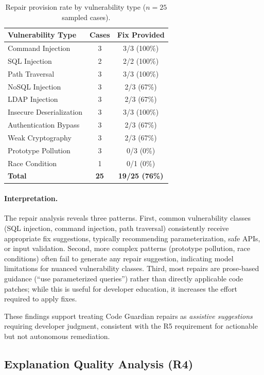 \begin{table}[H]
  \centering
  \caption{Repair provision rate by vulnerability type ($n=25$ sampled cases).}
  \label{tab:repair-by-type}
  \footnotesize
  \begin{tabular}{lcc}
    \toprule
    Vulnerability Type & Cases & Fix Provided \\
    \midrule
    Command Injection & 3 & 3/3 (100\%) \\
    SQL Injection & 2 & 2/2 (100\%) \\
    Path Traversal & 3 & 3/3 (100\%) \\
    NoSQL Injection & 3 & 2/3 (67\%) \\
    LDAP Injection & 3 & 2/3 (67\%) \\
    Insecure Deserialization & 3 & 3/3 (100\%) \\
    Authentication Bypass & 3 & 2/3 (67\%) \\
    Weak Cryptography & 3 & 2/3 (67\%) \\
    Prototype Pollution & 3 & 0/3 (0\%) \\
    Race Condition & 1 & 0/1 (0\%) \\
    \midrule
    \textbf{Total} & \textbf{25} & \textbf{19/25 (76\%)} \\
    \bottomrule
  \end{tabular}
\end{table}

\paragraph{Interpretation.}
The repair analysis reveals three patterns. First, common vulnerability classes (SQL injection, command injection, path traversal) consistently receive appropriate fix suggestions, typically recommending parameterization, safe APIs, or input validation. Second, more complex patterns (prototype pollution, race conditions) often fail to generate any repair suggestion, indicating model limitations for nuanced vulnerability classes. Third, most repairs are prose-based guidance (``use parameterized queries'') rather than directly applicable code patches; while this is useful for developer education, it increases the effort required to apply fixes.

These findings support treating Code Guardian repairs as \emph{assistive suggestions} requiring developer judgment, consistent with the R5 requirement for actionable but not autonomous remediation.

\subsection*{Explanation Quality Analysis (R4)}

